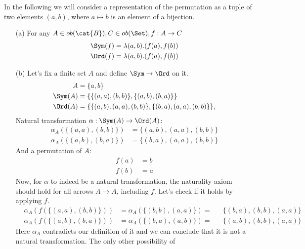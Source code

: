 \begin{answer}
  In the following we will consider a representation of the permutation as a
  tuple of two elements $(a, b)$, where $a \mapsto b$ is an element of a
  bijection.
  \begin{itemize}
    \item[(a)]
      For any $A \in ob(\cat{B}), C \in ob(\Set), f: A \to C$
      \begin{align*}
        \Sym(f) &= \lambda (a, b). (f(a), f(b))\\
        \Ord(f) &= \lambda (a, b).(f(a), f(b))
      \end{align*}
    \item[(b)]
      Let's fix a finite set $A$ and define $\Sym \to \Ord$ on it.\\
      \begin{align*}
        A &= \{a, b\}\\
        \Sym(A) &= \{\{(a, a), (b, b)\}, \{(a, b), (b, a)\}\}\\
        \Ord(A) &= \{\{(a, b), (a, a), (b, b)\}, \{(b, a), (a, a), (b, b)\}\},\\
      \end{align*}
      Natural transformation $\alpha: \Sym(A) \to \Ord(A)$:\\
      \begin{align*}
        \alpha_A(\{(a, a), (b, b)\}) &= \{(a, b), (a, a), (b, b)\}\\
        \alpha_A(\{(a, b), (b, a)\}) &= \{(b, a), (a, a), (b, b)\}
      \end{align*}
      And a permutation of $A$:
      \begin{align*}
        f(a) &= b\\
        f(b) &= a
      \end{align*}
      Now, for $\alpha$ to indeed be a natural transformation, the  naturality
      axiom should hold for all arrows $A \to A$, including $f$. Let's check if
      it holds by applying $f$.\\
      \begin{align*}
        &\alpha_A(f(\{(a, a), (b, b)\})) &= \alpha_A(\{(b, b), (a, a)\}) =&& \{(b, a), (b, b), (a, a)\}\\
        &\alpha_A(f(\{(a, b), (b, a)\})) &= \alpha_A(\{(b, a), (a, b)\}) =&& \{(a, b), (b, b), (a, a)\}
      \end{align*}
      Here $\alpha_A$ contradicts our definition of it and we can conclude that
      it is not a natural transformation. The only other possibility of

\end{itemize}
\end{answer}
